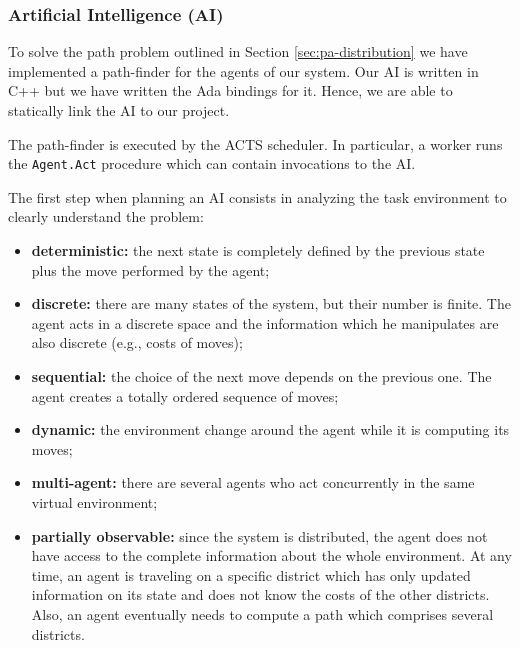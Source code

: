 \subsubsection{Artificial Intelligence (AI)}

To solve the path
problem outlined in Section \ref{sec:pa-distribution}
we have implemented a path-finder for the agents of our system.
Our AI is written in C++ but we have written the Ada bindings for it.
Hence, we are able to statically link the AI to our project.

The path-finder is executed by the ACTS scheduler. In particular, a
worker runs the \verb|Agent.Act| procedure which can contain invocations
to the AI.




The first step when planning an AI consists in analyzing the task environment
to clearly understand the problem:

\begin{itemize}

\item \textbf{deterministic:}
the next state is completely defined by the previous state plus the move
performed by the agent;

\item \textbf{discrete:}
there are many states of the system, but their number is finite.
The agent acts in a discrete space and the information which he manipulates
are also discrete (e.g., costs of moves);

\item \textbf{sequential:}
the choice of the next move depends on the previous one. The agent creates
a totally ordered sequence of moves;

\item \textbf{dynamic:}
the environment change around the agent while it is computing its moves;

\item \textbf{multi-agent:}
there are several agents who act concurrently in the same virtual
environment;

\item \textbf{partially observable:}
since the system is distributed, the agent does not have access to the complete
information about the whole environment. At any time, an agent is
traveling on a
specific district which has only updated information on its state and does not
know the costs of the other districts. Also, an agent eventually needs to
compute a path which comprises several districts.
\end{itemize}

